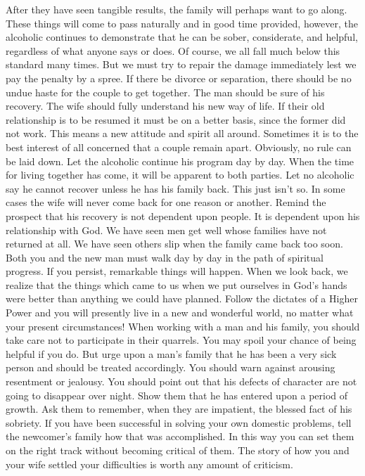 \begin{biblechapter}
After they have seen tangible results, the family will perhaps want to go along.  These things will come to pass naturally and in good time provided, however, the alcoholic continues to demonstrate that he can be sober, considerate, and helpful, regardless of what anyone says or does.  Of course, we all fall much below this standard many times.  But we must try to repair the damage immediately lest we pay the penalty by a spree.
If there be divorce or separation, there should be no undue haste for the couple to get together.  The man should be sure of his recovery.  The wife should fully understand his new way of life.  If their old relationship is to be resumed it must be on a better basis, since the former did not work.  This means a new attitude and spirit all around.  Sometimes it is to the best interest of all concerned that a couple remain apart.  Obviously, no rule can be laid down.  Let the alcoholic continue his program day by day.  When the time for living together has come, it will be apparent to both parties.
Let no alcoholic say he cannot recover unless he has his family back.  This just isn't so.  In some cases the wife will never come back for one reason or another.  Remind the prospect that his recovery is not dependent upon people.  It is dependent upon his relationship with God.  We have seen men get well whose families have not returned at all.  We have seen others slip when the family came back too soon.
Both you and the new man must walk day by day in the path of spiritual progress.  If you persist, remarkable things will happen.  When we look back, we realize that the things which came to us when we put ourselves in God's hands were better than anything we could have planned.  Follow the dictates of a Higher Power and you will presently live in a new and wonderful world, no matter what your present  circumstances!
When working with a man and his family, you should take care not to participate in their quarrels.  You may spoil your chance of being helpful if you do.  But urge upon a man's family that he has been a very sick person and should be treated accordingly.  You should warn against arousing resentment or jealousy.  You should point out that his defects of character are not going to disappear over night.  Show them that he has entered upon a period of growth.  Ask them to remember, when they are impatient, the blessed fact of his sobriety.
If you have been successful in solving your own domestic problems, tell the newcomer's family how that was accomplished.  In this way you can set them on the right track without becoming critical of them.  The story of how you and your wife settled your difficulties is worth any amount of criticism.

\end{biblechapter}
